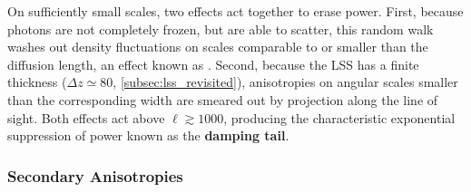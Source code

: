 \smallskip



On sufficiently small scales, two effects act together to erase power. First, because photons are not completely frozen, but are able to scatter, this random walk washes out density fluctuations on scales comparable to or smaller than the diffusion length, an effect known as . Second, because the LSS has a finite thickness ($\Delta z \simeq 80$, \cref{subsec:lss_revisited}), anisotropies on angular scales smaller than the corresponding width are smeared out by projection along the line of sight. Both effects act above $\ell \gtrsim 1000$, producing the characteristic exponential suppression of power known as the \textbf{damping tail}.

\vspace{-0.5em}

\subsubsection{Secondary Anisotropies} \label{subsec:secondary_anisotropies_detail}

